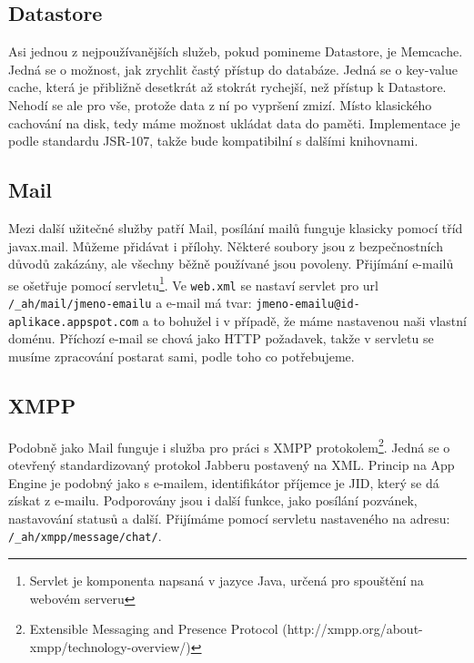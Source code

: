\subsection{Datastore}
Asi jednou z nejpoužívanějších služeb, pokud pomineme Datastore, je Memcache. Jedná se o možnost, jak zrychlit častý přístup do databáze. Jedná se o key-value cache, která je přibližně desetkrát až stokrát rychejší, než přístup k Datastore. Nehodí se ale pro vše, protože data z ní po vypršení zmizí. Místo klasického cachování na disk, tedy máme možnost ukládat data do paměti. Implementace je podle standardu JSR-107, takže bude kompatibilní s dalšími knihovnami.

\subsection{Mail}
Mezi další užitečné služby patří Mail, posílání mailů funguje klasicky pomocí tříd javax.mail. Můžeme přidávat i přílohy. Některé soubory jsou z bezpečnostních důvodů zakázány, ale všechny běžně používané jsou povoleny. Přijímání e-mailů se ošetřuje pomocí servletu\footnote{Servlet je komponenta napsaná v jazyce Java, určená pro spouštění na webovém serveru}. Ve \verb|web.xml| se nastaví servlet pro url \verb|/_ah/mail/jmeno-emailu| a e-mail má tvar: \verb|jmeno-emailu@id-aplikace.appspot.com| a to bohužel i v případě, že máme nastavenou naši vlastní doménu. Příchozí e-mail se chová jako HTTP požadavek, takže v servletu se musíme zpracování postarat sami, podle toho co potřebujeme. 

\subsection{XMPP}
Podobně jako Mail funguje i služba pro práci s XMPP protokolem\footnote{Extensible Messaging and Presence Protocol (http://xmpp.org/about-xmpp/technology-overview/)}. Jedná se o otevřený standardizovaný protokol Jabberu postavený na XML. Princip na App Engine je podobný jako s e-mailem, identifikátor příjemce je JID, který se dá získat  z e-mailu. Podporovány jsou i další funkce, jako posílání pozvánek, nastavování statusů a další. Přijímáme pomocí servletu nastaveného na adresu: \verb|/_ah/xmpp/message/chat/|.

